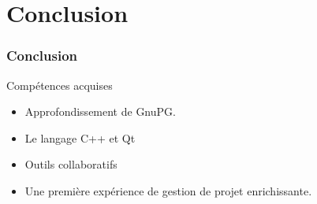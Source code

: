 \section{Conclusion}
\begin{frame}
  \frametitle{\color{white}Conclusion}
  \begin{block}{Compétences acquises}
      \begin{itemize}
        \item Approfondissement de GnuPG.
        \item Le langage C++ et Qt
        \item Outils collaboratifs
        \item Une première expérience de gestion de projet enrichissante.
      \end{itemize}
    \end{block}
\end{frame}
        
